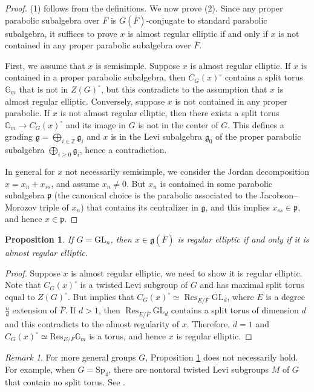 \documentclass[11pt]{amsart}
\newtheorem{prop}[thm]{Proposition}
\theoremstyle{definition}
\theoremstyle{remark}
\newtheorem{rem}[thm]{Remark}
\newcommand{\GL}{\mathrm{GL}}
\numberwithin{equation}{section}
\begin{document}
\begin{proof}
(1) follows from the definitions. We now prove (2). Since any proper parabolic subalgebra over $\overline{F}$ is $G(\overline{F})$-conjugate to standard parabolic subalgebra, it suffices to prove $x$ is almost regular elliptic if and only if $x$ is not contained in any proper parabolic subalgebra over $\overline{F}$. 

First, we assume that $x$ is semisimple. Suppose $x$ is almost regular elliptic. If $x$ is contained in a proper parabolic subalgebra, then $C_G (x)^\circ$ contains a split torus $\mathbb{G}_m$ that is not in $Z(G)^\circ$, but this contradicts to the assumption that $x$ is almost regular elliptic. Conversely, suppose $x$ is not contained in any proper parabolic. If $x$ is not almost regular elliptic, then there exists a split torus $\mathbb{G}_m \to C_G(x)^\circ$ and its image in $G$ is not in the center of $G$. This defines a grading $\mathfrak{g}=\bigoplus_{i\in \mathbb{Z}}\mathfrak{g}_i$ and $x$ is in the Levi subalgebra $\mathfrak{g}_0$ of the proper parabolic subalgebra $\bigoplus_{i\geq 0} \mathfrak{g}_i$, hence a contradiction.

In general for $x$ not necessarily semisimple, we consider the Jordan decomposition $x=x_n+x_{ss}$, and assume $x_n \neq 0$. But $x_n$ is contained in some parabolic subalgebra $\mathfrak{p}$ (the canonical choice is the parabolic associated to the Jacobson–Morozov triple of $x_n$) that contains its centralizer in $\mathfrak{g}$, and this implies $x_{ss} \in \mathfrak{p}$, and hence $x \in \mathfrak{p}$. 
\end{proof}

\begin{prop}\label{are for gln}
    If $G=\GL_n$, then $x\in \mathfrak{g}(\overline{F})$ is regular elliptic if and only if it is almost regular elliptic.
\end{prop}
\begin{proof}
    Suppose $x$ is almost regular elliptic, we need to show it is regular elliptic. Note that $C_G(x)^\circ$ is a twisted Levi subgroup of $G$ and has maximal split torus equal to $Z(G)^\circ$. But \cite[Lemma 4.3.4]{FS} implies that $C_G(x)^\circ \simeq \operatorname{Res}_{E/\overline{F}}\GL_d$, where $E$ is a degree $\frac{n}{d}$ extension of $\overline{F}$. If $d>1$, then $\operatorname{Res}_{E/\overline{F}}\GL_d$ contains a split torus of dimension $d$ and this contradicts to the almost regularity of $x.$ Therefore, $d=1$ and $C_G(x)^\circ \simeq \text{Res}_{E/F} \mathbb{G}_m$ is a torus, and hence $x$ is regular elliptic.
\end{proof}
\begin{rem}
    For more general groups $G$, Proposition \ref{are for gln} does not necessarily hold. For example, when $G=\text{Sp}_4$, there are nontoral twisted Levi subgroups $M$ of $G$ that contain no split torus. See  \cite[Example 5.9.1]{De}.
\end{rem}
\end{document}
